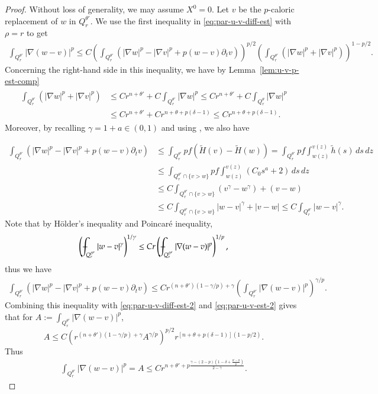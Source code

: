\documentclass[11pt,oneside,english]{amsart}
\newcommand{\de}{\delta}
\newcommand{\D}{\nabla}
\numberwithin{equation}{section}
\def\Xint#1{\mathchoice
  {\XXint\displaystyle\textstyle{#1}}%
  {\XXint\textstyle\scriptstyle{#1}}%
  {\XXint\scriptstyle\scriptscriptstyle{#1}}%
  {\XXint\scriptscriptstyle\scriptscriptstyle{#1}}%
  \!\int}
\def\XXint#1#2#3{{\setbox0=\hbox{$#1{#2#3}{\int}$}
    \vcenter{\hbox{$#2#3$}}\kern-.5\wd0}}
\def\dashint{\Xint-}
\theoremstyle{plain}
\numberwithin{equation}{section}
\begin{document}
\begin{proof}
Without loss of generality, we may assume $X^0=0$. Let $v$ be the $p$-caloric replacement of $w$ in $Q_r^{\theta'}$. We use the first inequality in \eqref{eq:par-u-v-diff-est} with $\rho=r$ to get
\begin{align}
    \label{eq:par-u-v-diff-est-2}
    \int_{Q_r^{\theta'}}|\D(w-v)|^p\le C\left(\int_{Q_r^{\theta'}}\left(|\D w|^p-|\D v|^p+p(w-v)\partial_tv\right)\right)^{p/2}\left(\int_{Q_r^{\theta'}}\left(|\D w|^p+|\D v|^p\right)\right)^{1-p/2}.
\end{align}
Concerning the right-hand side in this inequality, we have by Lemma~\ref{lem:u-v-p-est-comp}
\begin{align}
    \label{eq:par-u-v-est-2}
    \begin{split}
        \int_{Q_r^{\theta'}}(|\D w|^p+|\D v|^p)&\le Cr^{n+\theta'}+C\int_{Q_r^{\theta'}}|\D w|^p\le Cr^{n+\theta'}+C\int_{Q_r^\theta}|\D w|^p\\
        &\le Cr^{n+\theta'}+Cr^{n+\theta+p(\de-1)}\le Cr^{n+\theta+p(\de-1)}. 
    \end{split}
\end{align}
Moreover, by recalling $\gamma=1+a\in(0,1)$ and using \cite[Lemma~2.5]{LeiDeQTei15}, we also have

\begin{align*}
    \int_{Q_r^{\theta'}}\left(|\D w|^p-|\D v|^p+p(w-v)\partial_tv\right)&\le \int_{Q_r^{\theta'}}pf(\tilde H(v)-\tilde H(w))=\int_{Q_r^{\theta'}}pf\int_{w(z)}^{v(z)}\tilde h(s)\,ds\,dz\\
    &\le \int_{Q_r^{\theta'}\cap\{v>w\}}pf\int_{w(z)}^{v(z)}\left(C_0s^a+2\right)\,ds\,dz\\
    &\le C\int_{Q_r^{\theta'}\cap\{v>w\}}(v^\gamma-w^{\gamma})+(v-w)\\
    &\le C\int_{Q_r^{\theta'}\cap\{v>w\}}|w-v|^\gamma+|v-w|\le C\int_{Q_r^{\theta'}}|w-v|^\gamma.
\end{align*}
Note that by Hölder's inequality and Poincaré inequality,
$$
\left(\dashint_{Q_r^{\theta'}}|w-v|^\gamma\right)^{1/\gamma}\le Cr\left(\dashint_{Q_r^{\theta'}}|\D(w-v)|^p\right)^{1/p},
$$
thus we have
\begin{align}\label{eq:u-v-min-ineq}
    \int_{Q_r^{\theta'}}\left(|\D w|^p-|\D v|^p+p(w-v)\partial_tv\right)\le Cr^{(n+\theta')(1-\gamma/p)+\gamma}\left(\int_{Q_r^{\theta'}}|\D(w-v)|^p\right)^{\gamma/p}. 
\end{align}
Combining this inequality with \eqref{eq:par-u-v-diff-est-2} and \eqref{eq:par-u-v-est-2} gives that for $A:=\int_{Q_r^{\theta'}}|\D(w-v)|^p$,
$$
A\le C\left(r^{(n+\theta')(1-\gamma/p)+\gamma}A^{\gamma/p}\right)^{p/2}r^{[n+\theta+p(\de-1)](1-p/2)}.
$$
Thus
\begin{align}
    \label{eq:par-u-v-diff-est-3}
    \int_{Q_r^{\theta'}}|\D(w-v)|^p=A\le Cr^{n+\theta'+p\frac{\gamma-(2-p)(1-\de+\frac{\theta'-\theta}{p})}{2-\gamma}}.
\end{align}


\end{proof}
\end{document}
